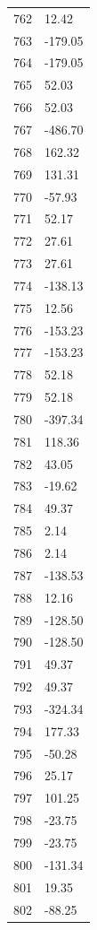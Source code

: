 \documentclass[a4paper,11pt]{article}
\begin{document}
\begin{center}
\begin{longtable}{|R{1.5cm}|R{2.5cm}|}
  762 &        12.42 \\
  763 &      -179.05 \\
  764 &      -179.05 \\
  765 &        52.03 \\
  766 &        52.03 \\
  767 &      -486.70 \\
  768 &       162.32 \\
  769 &       131.31 \\
  770 &       -57.93 \\
  771 &        52.17 \\
  772 &        27.61 \\
  773 &        27.61 \\
  774 &      -138.13 \\
  775 &        12.56 \\
  776 &      -153.23 \\
  777 &      -153.23 \\
  778 &        52.18 \\
  779 &        52.18 \\
  780 &      -397.34 \\
  781 &       118.36 \\
  782 &        43.05 \\
  783 &       -19.62 \\
  784 &        49.37 \\
  785 &         2.14 \\
  786 &         2.14 \\
  787 &      -138.53 \\
  788 &        12.16 \\
  789 &      -128.50 \\
  790 &      -128.50 \\
  791 &        49.37 \\
  792 &        49.37 \\
  793 &      -324.34 \\
  794 &       177.33 \\
  795 &       -50.28 \\
  796 &        25.17 \\
  797 &       101.25 \\
  798 &       -23.75 \\
  799 &       -23.75 \\
  800 &      -131.34 \\
  801 &        19.35 \\
  802 &       -88.25 \\

\end{longtable}
\end{center}
\end{document}
